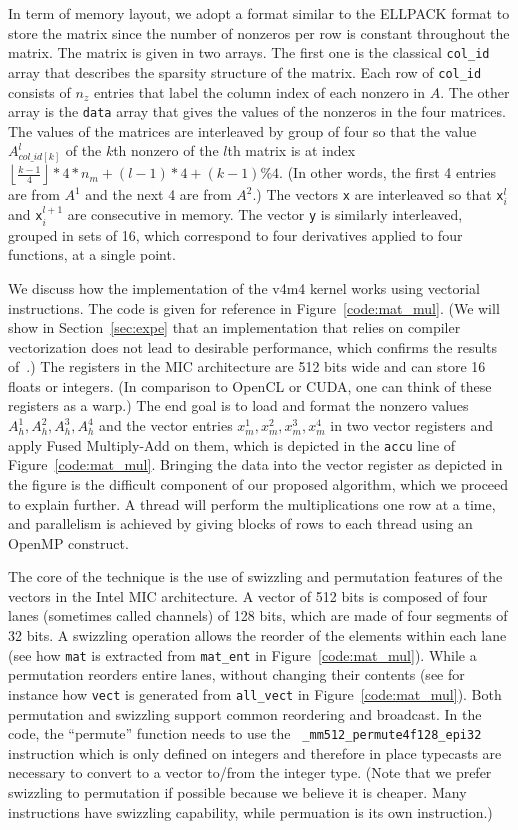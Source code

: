 \documentclass[10pt,conference,compsocconf]{IEEEtran}
\newcommand{\floor}[1]{\left\lfloor#1\right\rfloor}
\begin{document}
In term of memory layout, we adopt a format similar to the ELLPACK
format to store the matrix since the number of nonzeros per row is
constant throughout the matrix. The matrix is given in two arrays. The
first one is the classical {\tt col\_id} array that describes the
sparsity structure of the matrix. Each row of {\tt col\_id} consists
of $n_z$ entries that label the column index of each nonzero in
$A$. The other array is the {\tt data} array that gives the values of
the nonzeros in the four matrices. The values of the matrices are
interleaved by group of four so that the value $A^l_{col\_id[k]}$ of
the $k$th nonzero of the $l$th matrix is at index $\floor{\frac{k-1}{4}}*4*n_m + (l-1)*4+(k-1)\%4$.
(In other words, the first 4 entries are from $A^{1}$ and the next 4 are from $A^2$.) The vectors {\tt x} are
interleaved so that {\tt x}$^l_i$ and {\tt x}$^{l+1}_i$ are
consecutive in memory. The vector {\tt y} is similarly interleaved,
grouped in sets of 16, which correspond to four derivatives applied to
four functions, at a single point.


We discuss how the implementation of the v4m4 kernel works using
vectorial instructions. The code is given for reference in
Figure~\ref{code:mat_mul}. (We will show in Section~\ref{sec:expe}
that an implementation that relies on compiler vectorization does not lead
to desirable performance, which confirms the results
of~\cite{Saule13-ARXIV}.) The registers in the MIC architecture are
512 bits wide and can store 16 floats or integers. (In comparison to
OpenCL or CUDA, one can think of these registers as a warp.) The end
goal is to load and format the nonzero values $A_h^1,A_h^2,A_h^3,A_h^4$
and the vector entries $x_m^1,x_m^2,x_m^3,x_m^4$ in two vector registers and 
apply Fused Multiply-Add on them, which is depicted in the {\tt accu} line of 
Figure~\ref{code:mat_mul}. Bringing the data into the vector
register as depicted in the figure is the difficult component of our 
proposed algorithm, which we proceed to explain further. 
A thread will perform the multiplications one row at a time,
and parallelism is achieved by giving blocks of rows to each thread
using an OpenMP construct.


The core of the technique is the use of swizzling and permutation
features of the vectors in the Intel MIC architecture. A vector of 512
bits is composed of four lanes (sometimes called channels) of 128
bits, which are made of four segments of 32 bits. A swizzling
operation allows the reorder of the elements within each lane (see how
{\tt mat} is extracted from {\tt mat\_ent} in
Figure~\ref{code:mat_mul}). While a permutation reorders entire lanes,
without changing their contents (see for instance how {\tt vect} is
generated from {\tt all\_vect} in Figure~\ref{code:mat_mul}).  Both
permutation and swizzling support common reordering and broadcast. In
the code, the ``permute'' function needs to use the {\tt
  \_mm512\_permute4f128\_epi32} instruction which is only defined on
integers and therefore in place typecasts are necessary to convert to
a vector to/from the integer type.  (Note that we prefer swizzling to
permutation if possible because we believe it is cheaper. Many
instructions have swizzling capability, while permuation is its own
instruction.)
\end{document}
